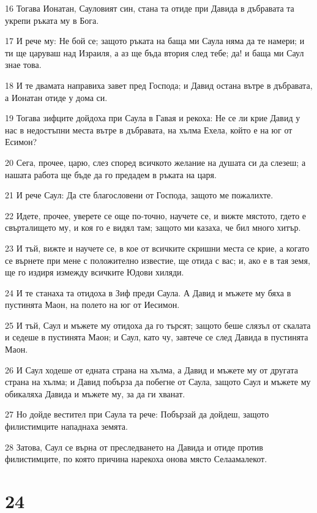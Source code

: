 \par 16 Тогава Ионатан, Сауловият син, стана та отиде при Давида в дъбравата та укрепи ръката му в Бога.
\par 17 И рече му: Не бой се; защото ръката на баща ми Саула няма да те намери; и ти ще царуваш над Израиля, а аз ще бъда втория след тебе; да! и баща ми Саул знае това.
\par 18 И те двамата направиха завет пред Господа; и Давид остана вътре в дъбравата, а Ионатан отиде у дома си.
\par 19 Тогава зифците дойдоха при Саула в Гавая и рекоха: Не се ли крие Давид у нас в недостъпни места вътре в дъбравата, на хълма Ехела, който е на юг от Есимон?
\par 20 Сега, прочее, царю, слез според всичкото желание на душата си да слезеш; а нашата работа ще бъде да го предадем в ръката на царя.
\par 21 И рече Саул: Да сте благословени от Господа, защото ме пожалихте.
\par 22 Идете, прочее, уверете се още по-точно, научете се, и вижте мястото, гдето е свърталището му, и коя го е видял там; защото ми казаха, че бил много хитър.
\par 23 И тъй, вижте и научете се, в кое от всичките скришни места се крие, а когато се върнете при мене с положително известие, ще отида с вас; и, ако е в тая земя, ще го издиря измежду всичките Юдови хиляди.
\par 24 И те станаха та отидоха в Зиф преди Саула. А Давид и мъжете му бяха в пустинята Маон, на полето на юг от Иесимон.
\par 25 И тъй, Саул и мъжете му отидоха да го търсят; защото беше слязъл от скалата и седеше в пустинята Маон; и Саул, като чу, завтече се след Давида в пустинята Маон.
\par 26 И Саул ходеше от едната страна на хълма, а Давид и мъжете му от другата страна на хълма; и Давид побърза да побегне от Саула, защото Саул и мъжете му обикаляха Давида и мъжете му, за да ги хванат.
\par 27 Но дойде вестител при Саула та рече: Побързай да дойдеш, защото филистимците нападнаха земята.
\par 28 Затова, Саул се върна от преследването на Давида и отиде против филистимците, по която причина нарекоха онова място Селаамалекот.

\chapter{24}

